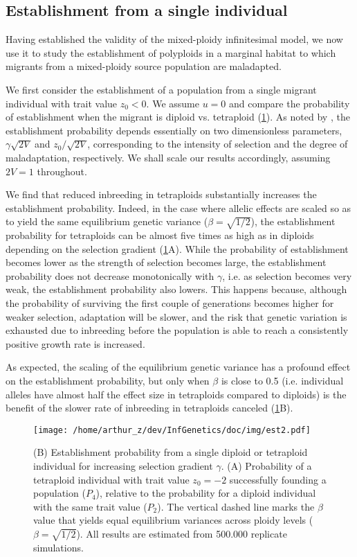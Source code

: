\documentclass[11pt,a4paper]{article}
\begin{document}
\subsection*{Establishment from a single individual}

Having established the validity of the mixed-ploidy infinitesimal model, we now
use it to study the establishment of polyploids in a marginal habitat to which
migrants from a mixed-ploidy source population are maladapted.

We first consider the establishment of a population from a single migrant
individual with trait value $z_0 < 0$.
We assume $u=0$ and compare the probability of establishment when the migrant
is diploid vs. tetraploid (\cref{fig:est1}).
As noted by \cite{barton2018}, the establishment probability depends
essentially on two dimensionless parameters, $\gamma\sqrt{2V}$ and
$z_0/\sqrt{2V}$, corresponding to the intensity of selection and the degree of
maladaptation, respectively.
We shall scale our results accordingly, assuming $2V=1$ throughout.

We find that reduced inbreeding in tetraploids substantially increases the
establishment probability.
Indeed, in the case where allelic effects are scaled so as to yield the same
equilibrium genetic variance ($\beta = \sqrt{1/2}$), the establishment probability 
for tetraploids can be almost five times as high as in diploids depending on
the selection gradient (\cref{fig:est1}A).
While the probability of establishment becomes lower as the strength of
selection becomes large, the establishment probability does not decrease
monotonically with $\gamma$, i.e. as selection becomes very weak, the
establishment probability also lowers.
This happens because, although the probability of surviving the first couple of
generations becomes higher for weaker selection, adaptation will be slower, and
the risk that genetic variation is exhausted due to inbreeding before the
population is able to reach a consistently positive growth rate is increased.

As expected, the scaling of the equilibrium genetic variance has a profound
effect on the establishment probability, but only when $\beta$ is close to 0.5
(i.e. individual alleles have almost half the effect size in tetraploids
compared to diploids) is the benefit of the slower rate of inbreeding in
tetraploids canceled (\cref{fig:est1}B).


\begin{figure}[t]
\centering
\texttt{[image: /home/arthur\_z/dev/InfGenetics/doc/img/est2.pdf]}
\caption{
(B) Establishment probability from a single diploid or tetraploid individual
for increasing selection gradient $\gamma$.
(A) Probability of a tetraploid individual with trait value $z_0 = -2$
successfully founding a population ($P_4$), relative to the probability for a
diploid individual with the same trait value ($P_2$).
The vertical dashed line marks the $\beta$ value that yields equal equilibrium
variances across ploidy levels ($\beta = \sqrt{1/2}$).
All results are estimated from 500.000 replicate simulations.
\label{fig:est1}}
\end{figure}
\end{document}

